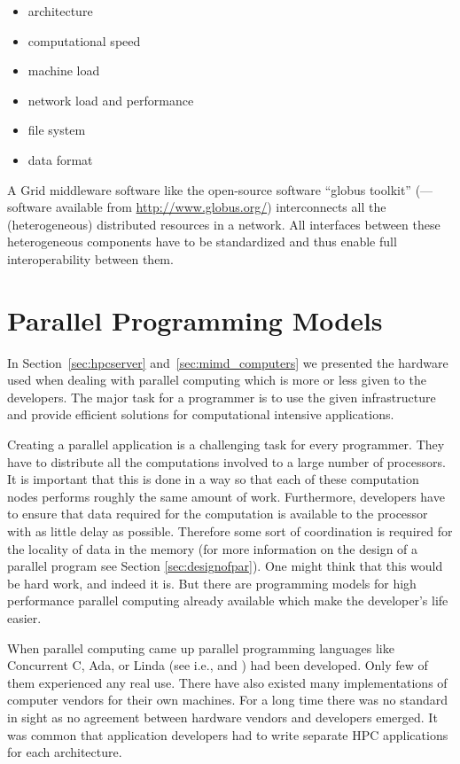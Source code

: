\begin{itemize}
\item architecture
\item computational speed
\item machine load
\item network load and performance
\item file system
\item data format
\end{itemize}

A Grid middleware software like the open-source software ``globus
toolkit'' (\cite{foster97gmi}---software available from
\url{http://www.globus.org/}) interconnects all the (heterogeneous)
distributed resources in a network.
All interfaces between these heterogeneous components have to be standardized
and thus enable full interoperability between them.

\section{Parallel Programming Models}
\label{sec:programming_models}

In Section~\ref{sec:hpcserver} and~\ref{sec:mimd_computers} we
presented the hardware used when dealing with parallel computing which is
more or less given to the developers. The major task for a programmer
is to use the given infrastructure and provide efficient solutions for
computational intensive applications.

Creating a parallel application is a challenging task for every
programmer. They have to distribute all
the computations involved to a large number of processors. It is
important that this is done in a way so that each of these computation
nodes performs roughly the same amount of work. Furthermore,
developers have to
ensure that data required for the computation is available to the
processor with as little delay as possible. Therefore some sort of
coordination is required for the locality of data in the memory (for
more information on the design of a parallel program see Section
\ref{sec:designofpar}). 
One might think that this would be hard work, and indeed it is. But
there are programming models for high performance parallel computing
already available which make the developer's life easier.


When parallel computing came up parallel  programming
languages like Concurrent C, Ada, or Linda (see i.e.,
\cite{gehani88:concurrentprog} and \cite{wilson96:parallelprog}) had been
developed. Only few of them experienced any real use. There
have also existed many implementations of computer vendors for their own
machines. For a long time there was no standard in sight as no
agreement between hardware vendors and developers emerged. It was
common that application developers had to write separate HPC
applications for each architecture.

